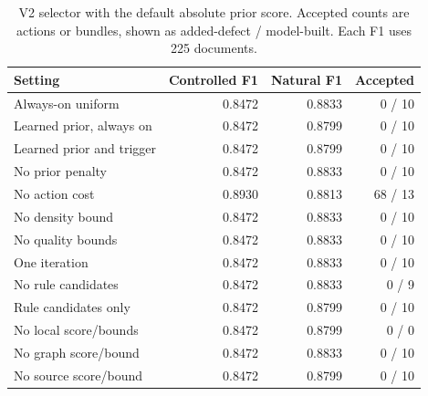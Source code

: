 \begin{table}[t]

\centering

\caption{V2 selector with the default absolute prior score. Accepted counts are actions or bundles, shown as added-defect / model-built. Each F1 uses 225 documents.}
\label{tab:optimizer_complete}

\small

\begin{tabular}{lrrr}

\toprule

Setting & Controlled F1 & Natural F1 & Accepted \\

\midrule

Always-on uniform & 0.8472 & 0.8833 & 0 / 10 \\

Learned prior, always on & 0.8472 & 0.8799 & 0 / 10 \\

Learned prior and trigger & 0.8472 & 0.8799 & 0 / 10 \\

No prior penalty & 0.8472 & 0.8833 & 0 / 10 \\

No action cost & 0.8930 & 0.8813 & 68 / 13 \\

No density bound & 0.8472 & 0.8833 & 0 / 10 \\

No quality bounds & 0.8472 & 0.8833 & 0 / 10 \\

One iteration & 0.8472 & 0.8833 & 0 / 10 \\

No rule candidates & 0.8472 & 0.8833 & 0 / 9 \\

Rule candidates only & 0.8472 & 0.8799 & 0 / 10 \\

No local score/bounds & 0.8472 & 0.8799 & 0 / 0 \\

No graph score/bound & 0.8472 & 0.8833 & 0 / 10 \\

No source score/bound & 0.8472 & 0.8799 & 0 / 10 \\

\bottomrule

\end{tabular}

\end{table}

